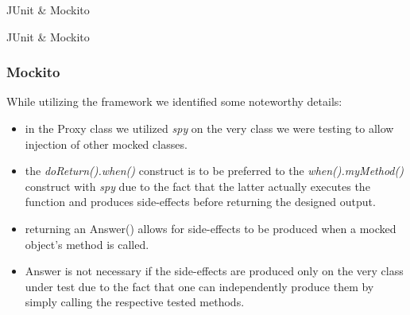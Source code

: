 \documentclass{beamer}
\begin{document}
\begin{section}{JUnit \& Mockito}
\begin{subsection}{JUnit \& Mockito}
				\begin{frame}
					\frametitle{Mockito}
									
						While utilizing the framework we identified some noteworthy details:
						\begin{itemize}
							\item in the Proxy class we utilized \textit{spy} on the very class we were testing to allow injection of other mocked classes.
							\item the \textit{doReturn().when()} construct is to be preferred to the \textit{when().myMethod()} construct with \textit{spy} due to the fact that the latter actually executes the function and produces side-effects before returning the designed output.
							\item returning an Answer() allows for side-effects to be produced when a mocked object's method is called. 
							\item Answer is not necessary if the side-effects are produced only on the very class under test due to the fact that one can independently produce them by simply calling the respective tested methods.
						\end{itemize}
					\end{frame}
			\end{subsection}
		\end{section}
		
\end{document}
